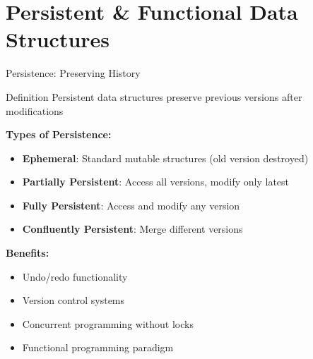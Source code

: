 \documentclass[aspectratio=169,xcolor=dvipsnames]{beamer}
\begin{document}
\section{Persistent \& Functional Data Structures}

\begin{frame}{Persistence: Preserving History}
  \begin{block}{Definition}
    Persistent data structures preserve previous versions after modifications
  \end{block}

  \vspace{0.3cm}
  \textbf{Types of Persistence:}
  \begin{itemize}
    \item \textbf{Ephemeral}: Standard mutable structures (old version destroyed)
    \item \textbf{Partially Persistent}: Access all versions, modify only latest
    \item \textbf{Fully Persistent}: Access and modify any version
    \item \textbf{Confluently Persistent}: Merge different versions
  \end{itemize}

  \vspace{0.3cm}
  \textbf{Benefits:}
  \begin{itemize}
    \item Undo/redo functionality
    \item Version control systems
    \item Concurrent programming without locks
    \item Functional programming paradigm
  \end{itemize}
\end{frame}
\end{document}
